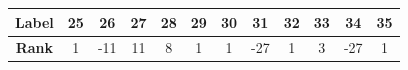 \vspace{0.5cm}

\begin{tabular}{|c|*{11}{c|}}
	\hline
	\textbf{Label} & 25 & 26 & 27 & 28 & 29 & 30 & 31 & 32 & 33 & 34 & 35 \\
	\hline
	\textbf{Rank} & 1 & -11 & 11 & 8 & 1 & 1 & -27 & 1 & 3 & -27 & 1 \\
	\hline
\end{tabular}



